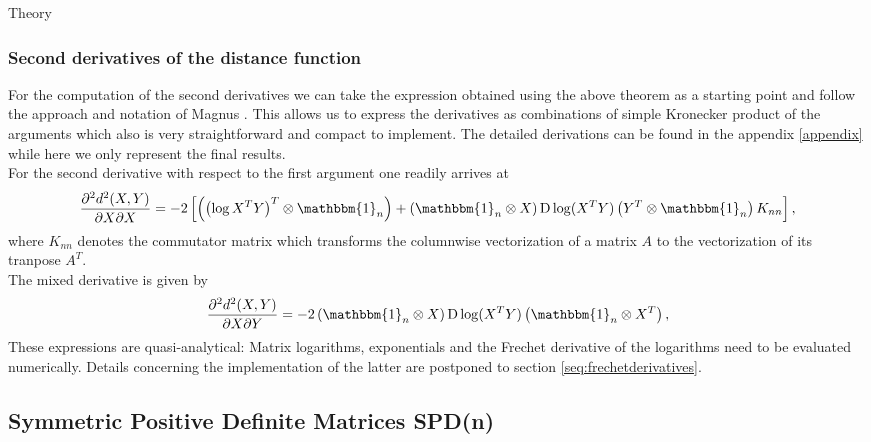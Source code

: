 \begin{chapter}{Theory}
\subsubsection{Second derivatives of the distance function} %
\label{ssub:Second derivatives of the distance function}
For the computation of the second derivatives we can take the expression obtained using the above theorem as a starting point and follow the approach and notation of Magnus \cite{magnus}. 
This allows us to express the derivatives as combinations of simple Kronecker product of the arguments which also is very straightforward and compact to implement. 
The detailed derivations can be found in the appendix \ref{appendix} while here we only represent the final results. \\
For the second derivative with respect to the first argument one readily arrives at
\begin{equation}
    \label{eq:son_xx_der}
    \frac{\partial^2 d^2(X,Y)}{\partial X\partial X} = -2\left[\left(\left(\log X^TY\right)^T\otimes\mathbbm{1}_n\right) + \left(\mathbbm{1}_n\otimes X \right)\operatorname{D}\log(X^TY) \left(Y^T\otimes\mathbbm{1}_n \right) K_{nn}\right],
\end{equation}
where $K_{nn}$ denotes the commutator matrix which transforms the columnwise vectorization of a matrix $A$ to the vectorization of its tranpose $A^T$.\\

The mixed derivative is given by
\begin{equation}
    \label{eq:son_xy_der}
    \frac{\partial^2 d^2(X,Y)}{\partial X\partial Y} = -2\left(\mathbbm{1}_n\otimes X \right)\operatorname{D}\log(X^TY) \left(\mathbbm{1}_n\otimes X^T \right),
\end{equation}
These expressions are quasi-analytical: Matrix logarithms, exponentials and the Frechet derivative of the logarithms need to be evaluated numerically. Details concerning the 
implementation of the latter are postponed to section \ref{seq:frechetderivatives}.




\subsection{Symmetric Positive Definite Matrices SPD(n)} %
\label{sub:SPD(N)}


\end{chapter}

